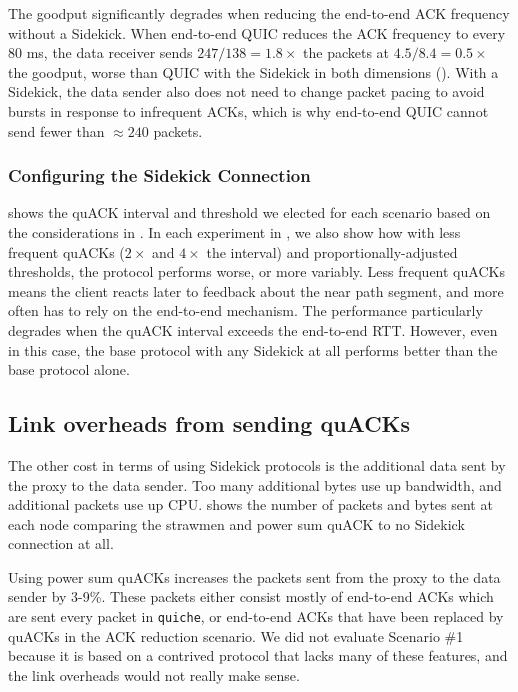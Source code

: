 The goodput significantly degrades when reducing the end-to-end ACK frequency
without a Sidekick. When end-to-end QUIC reduces the ACK frequency to every
80 ms, the data receiver sends $247 / 138 = 1.8\times$ the packets at
$4.5 / 8.4 = 0.5\times$ the goodput, worse than QUIC with the Sidekick
in both dimensions (). With a Sidekick,
the data sender also does not need to change packet pacing to avoid bursts in
response to infrequent ACKs, which is why end-to-end QUIC cannot send fewer
than $\approx 240$ packets.

\subsubsection{Configuring the Sidekick Connection}
 shows the quACK interval and threshold we
elected for each scenario based on the considerations in
. In each experiment in ,
we also show how with less frequent quACKs ($2\times$ and $4\times$ the
interval) and proportionally-adjusted thresholds, the protocol performs worse,
or more variably. Less frequent quACKs means the client reacts later to
feedback about the near path segment, and more often has to rely on the
end-to-end mechanism. The performance particularly degrades when the quACK
interval exceeds the end-to-end RTT. However, even in this case, the base
protocol with any Sidekick at all performs better than the base protocol alone\@.

\subsection{Link overheads from sending quACKs}
\label{sec:sidekick:emulation:link-overheads}



The other cost in terms of using Sidekick protocols is the additional data
sent by the proxy to the data sender.
Too many additional bytes use up bandwidth, and additional packets use
up CPU\@.
 shows the number of packets and bytes sent at each
node comparing the strawmen and power sum quACK to no Sidekick connection at all.

Using power sum quACKs increases the packets sent from the proxy to the data
sender
by 3-9\%. These packets either consist mostly
of end-to-end ACKs which are sent every packet in \texttt{quiche}, or end-to-end
ACKs that have been replaced by quACKs in the ACK reduction scenario.
We did not evaluate Scenario \#1 because it is based
on a contrived protocol that lacks many of these features, and the link
overheads would not really make sense.

